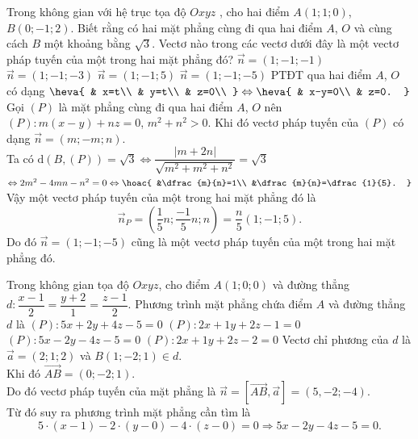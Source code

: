 \begin{ex}%
Trong không gian với hệ trục tọa độ $Oxyz$ , cho hai điểm $ A(1;1;0)$, $ B(0;-1;2)$. Biết rằng có hai mặt phẳng cùng đi qua hai điểm $ A$, $ O$ và cùng cách $ B$ một khoảng bằng $\sqrt{3}$. Vectơ nào trong các vectơ dưới đây là một vectơ pháp tuyến của một trong hai mặt phẳng đó?
\choice
{$\overrightarrow{n}=(1;-1;-1)$}
{$\overrightarrow{n}=(1;-1;-3)$}
{\True $\overrightarrow{n}=(1;-1;5)$}
{$\overrightarrow{n}=(1;-1;-5)$}
\loigiai
{
PTĐT qua hai điểm $ A$, $ O$ có dạng $\heva{
& x=t\\ 
& y=t\\ 
& z=0\\ 
}\Leftrightarrow\heva{
& x-y=0\\ 
& z=0.
}$\\
Gọi $(P)$ là mặt phẳng cùng đi qua hai điểm $ A$, $ O$ nên $(P)\colon  m\left(x-y\right)+nz=0$, $m^2+n^2>0$. Khi đó vectơ pháp tuyến của $(P)$ có dạng $\overrightarrow{n}=(m;-m;n)$.\\
Ta có $ \mathrm{d}\left(B,(P)\right)=\sqrt{3}\Leftrightarrow\dfrac{\left| m+2n\right|}{\sqrt{m^2+m^2+n^2}}=\sqrt{3}$ $\Leftrightarrow 2m^2-4mn-n^2=0\Leftrightarrow\hoac{
&\dfrac{m}{n}=1\\ 
&\dfrac{m}{n}=\dfrac{1}{5}.
}$\\
Vậy một vectơ pháp tuyến của một trong hai mặt phẳng đó là $$\overrightarrow{n}_P=\left(\dfrac{1}{5}n; \dfrac{-1}{5}n; n\right)=\dfrac{n}{5}\left(1; -1; 5\right).$$
 Do đó $\overrightarrow{n}=(1;-1;-5)$ cũng là một vectơ pháp tuyến của một trong hai mặt phẳng đó.}
\end{ex}

\begin{ex}%
Trong không gian tọa độ $ Oxyz$, cho điểm $A(1;0;0)$ và đường thẳng  $ d\colon\dfrac{x-1}{2}=\dfrac{y+2}{1}=\dfrac{z-1}{2}$. Phương trình mặt phẳng chứa điểm $A$ và đường thẳng $d$ là
\choice
{$(P)\colon 5x+2y+4z-5=0$}
{$(P)\colon 2x+1y+2z-1=0$}
{\True $(P)\colon 5x-2y-4z-5=0$}
{$(P)\colon 2x+1y+2z-2=0$}
\loigiai
{
Vectơ chỉ phương của $ d$ là $\overrightarrow{a}=(2; 1; 2)$ và $ B(1; -2; 1)\in d$.\\
Khi đó $\overrightarrow{AB}=(0; -2; 1)$.\\
Do đó vectơ pháp tuyến của mặt phẳng là $\overrightarrow{n}=\left[\overrightarrow{AB},\overrightarrow{a}\right]=(5,-2;-4)$.\\
Từ đó suy ra phương trình mặt phẳng cần tìm là $$ 5\cdot(x-1)-2\cdot(y-0)-4\cdot(z-0)=0\Rightarrow 5x-2y-4z-5=0.$$}
\end{ex}

